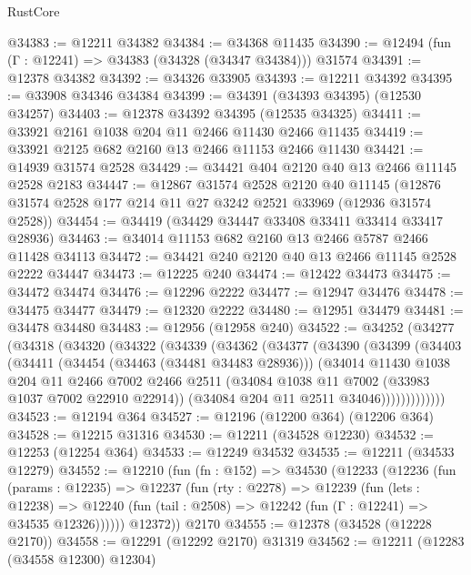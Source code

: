\begin{lexlean}{RustCore}
\begin{coremodule}
@34383 := @12211 @34382
@34384 := @34368 @11435
@34390 := @12494 (fun (Γ : @12241) => @34383 (@34328 (@34347 @34384))) @31574
@34391 := @12378 @34382
@34392 := @34326 @33905
@34393 := @12211 @34392
@34395 := @33908 @34346 @34384
@34399 := @34391 (@34393 @34395) (@12530 @34257)
@34403 := @12378 @34392 @34395 (@12535 @34325)
@34411 := @33921 @2161 @1038 @204 @11 @2466 @11430 @2466 @11435
@34419 := @33921 @2125 @682 @2160 @13 @2466 @11153 @2466 @11430
@34421 := @14939 @31574 @2528
@34429 := @34421 @404 @2120 @40 @13 @2466 @11145 @2528 @2183
@34447 := @12867
    @31574
    @2528
    @2120
    @40
    @11145
    (@12876 @31574 @2528 @177 @214 @11 @27 @3242 @2521 @33969 (@12936 @31574 @2528))
@34454 := @34419 (@34429 @34447 @33408 @33411 @33414 @33417 @28936)
@34463 := @34014 @11153 @682 @2160 @13 @2466 @5787 @2466 @11428 @34113
@34472 := @34421 @240 @2120 @40 @13 @2466 @11145 @2528 @2222 @34447
@34473 := @12225 @240
@34474 := @12422 @34473
@34475 := @34472 @34474
@34476 := @12296 @2222
@34477 := @12947 @34476
@34478 := @34475 @34477
@34479 := @12320 @2222
@34480 := @12951 @34479
@34481 := @34478 @34480
@34483 := @12956 (@12958 @240)
@34522 := @34252
    (@34277
      (@34318
        (@34320
          (@34322
            (@34339
              (@34362
                (@34377
                  (@34390
                    (@34399
                      (@34403
                        (@34411
                          (@34454 (@34463 (@34481 @34483 @28936)))
                          (@34014
                            @11430
                            @1038
                            @204
                            @11
                            @2466
                            @7002
                            @2466
                            @2511
                            (@34084 @1038 @11 @7002 (@33983 @1037 @7002 @22910 @22914))
                            (@34084 @204 @11 @2511 @34046)))))))))))))
@34523 := @12194 @364
@34527 := @12196 (@12200 @364) (@12206 @364)
@34528 := @12215 @31316
@34530 := @12211 (@34528 @12230)
@34532 := @12253 (@12254 @364)
@34533 := @12249 @34532
@34535 := @12211 (@34533 @12279)
@34552 := @12210
    (fun (fn : @152) =>
    @34530
      (@12233
        (@12236
          (fun (params : @12235) =>
          @12237
            (fun (rty : @2278) =>
            @12239
              (fun (lets : @12238) =>
              @12240 (fun (tail : @2508) => @12242 (fun (Γ : @12241) => @34535 @12326))))))
        @12372))
    @2170
@34555 := @12378 (@34528 (@12228 @2170))
@34558 := @12291 (@12292 @2170) @31319
@34562 := @12211 (@12283 (@34558 @12300) @12304)

\end{coremodule}
\end{lexlean}
